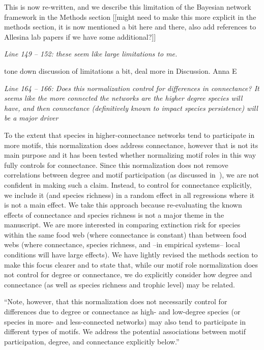 \documentclass[12pt]{article}
\newcommand{\us}{\rm \setlength{\leftskip}{0.3cm} \setlength{\rightskip}{0.3cm}}
\newcommand{\them}{\it \setlength{\leftskip}{0cm} \setlength{\rightskip}{0cm}}
\begin{document}
\us This is now re-written, and we describe this limitation of the Bayesian network framework in the Methods section [[might need to make this more explicit in the methods section, it is now mentioned a bit here and there, also add references to Allesina lab papers if we have some additional?]]

\them
Line 149 – 152: these seem like large limitations to me.

\us tone down discussion of limitations a bit, deal more in Discussion. Anna E

\them
Line 164 – 166: Does this normalization control for differences in connectance? It seems like the more connected the networks are the higher degree species will have, and then connectance (definitively known to impact species persistence) will be a major driver

\us To the extent that species in higher-connectance networks tend to participate in more motifs, this normalization does address connectance, however that is not its main purpose and it has been tested whether normalizing motif roles in this way fully controls for connectance.
Since this normalization does not remove correlations between degree and motif participation (as discussed in~\citealp[]{Cirtwill2021_inprep}), we are not confident in making such a claim.
Instead, to control for connectance explicitly, we include it (and species richness) in a random effect in all regressions where it is not a main effect. 
We take this approach because re-evaluating the known effects of connectance and species richness is not a major theme in the manuscript.
We are more interested in comparing extinction risk for species within the same food web (where connectance is constant) than between food webs (where connectance, species richness, and --in empirical systems-- local conditions will have large effects).
We have lightly revised the methods section to make this focus clearer and to state that, while our motif role normalization does not control for degree or connectance, we do explicitly consider how degree and connectance (as well as species richness and trophic level) may be related. 



    ``Note, however, that this normalization does not necessarily control for differences due to degree or connectance as high- and low-degree species (or species in more- and less-connected networks) may also tend to participate in different types of motifs.
    We address the potential associations between motif participation, degree, and connectance explicitly below.''
\end{document}
